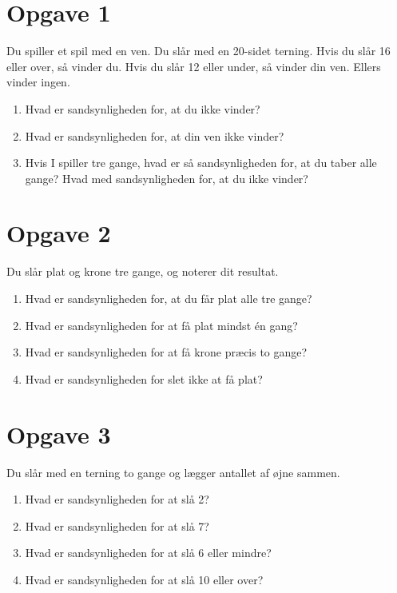 \documentclass[12pt]{article}
\begin{document}
\section*{Opgave 1}
Du spiller et spil med en ven. Du slår med en 20-sidet terning. Hvis du slår 16 eller over, så vinder du. Hvis du slår 12 eller under, så vinder din ven. Ellers vinder ingen.
\begin{enumerate}[label=\roman*)]
	\item Hvad er sandsynligheden for, at du ikke vinder?
	\item Hvad er sandsynligheden for, at din ven ikke vinder?
	\item Hvis I spiller tre gange, hvad er så sandsynligheden for, at du taber alle gange? Hvad med sandsynligheden for, at du ikke vinder?
\end{enumerate}

\section*{Opgave 2}
Du slår plat og krone tre gange, og noterer dit resultat.
\begin{enumerate}[label=\roman*)]
	\item Hvad er sandsynligheden for, at du får plat alle tre gange?
	\item Hvad er sandsynligheden for at få plat mindst én gang?
	\item Hvad er sandsynligheden for at få krone præcis to gange?
	\item Hvad er sandsynligheden for slet ikke at få plat?
\end{enumerate}

\section*{Opgave 3}
Du slår med en terning to gange og lægger antallet af øjne sammen. 
\begin{enumerate}[label=\roman*)]
	\item Hvad er sandsynligheden for at slå 2?
	\item Hvad er sandsynligheden for at slå 7?
	\item Hvad er sandsynligheden for at slå 6 eller mindre?
	\item Hvad er sandsynligheden for at slå 10 eller over?
\end{enumerate}
\end{document}
